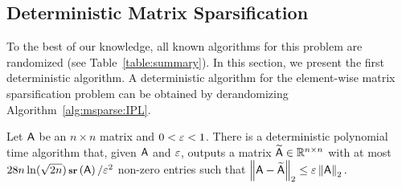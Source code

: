 \subsection{Deterministic Matrix Sparsification}\label{sec:sparsification:matrix}
%
%
To the best of our knowledge, all known algorithms for this problem are randomized (see Table~\ref{table:summary}). In this section, we present the first deterministic algorithm. A deterministic algorithm for the element-wise matrix sparsification problem can be obtained by derandomizing Algorithm~\ref{alg:msparse:IPL}.
\begin{theorem}\label{thm:matrix_sparse:slow}
Let ${\mathsf{A} }$ be an $n\times n$ matrix and $ 0 < \varepsilon <1$.  There is a deterministic polynomial time algorithm that, given ${\mathsf{A} }$ and $ \varepsilon$, outputs a matrix $\widetilde{{\mathsf{A} }}\in \mathbb{R}^{n\times n}$ with at most $ 28 n \ln (\sqrt{2n} ) \operatorname{\textbf{\footnotesize sr}}\left({\mathsf{A} }\right) /\varepsilon^2$ non-zero entries such that $\left\|{\mathsf{A} } - \widetilde{{\mathsf{A} }}\right\|_2 \leq \varepsilon \left\|{\mathsf{A} }\right\|_2.$
\end{theorem}
